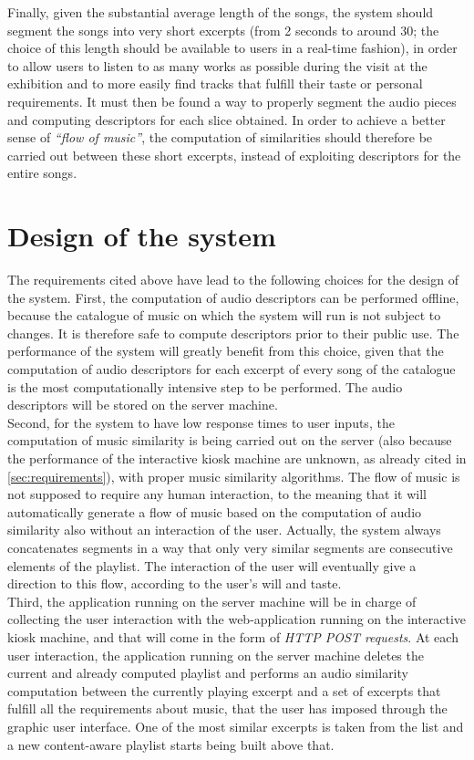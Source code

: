 Finally, given the substantial average length of the songs, the system should segment the songs into very short excerpts (from 2 seconds to around 30; the choice of this length should be available to users in a real-time fashion), in order to allow users to listen to as many works as possible during the visit at the exhibition and to more easily find tracks that fulfill their taste or personal requirements. It must then be found a way to properly segment the audio pieces and computing descriptors for each slice obtained. In order to achieve a better sense of \textit{``flow of music''}, the computation of similarities should therefore be carried out between these short excerpts, instead of exploiting descriptors for the entire songs.

\section{Design of the system}
The requirements cited above have lead to the following choices for the design of the system. First, the computation of audio descriptors can be performed offline, because the catalogue of music on which the system will run is not subject to changes. It is therefore safe to compute descriptors prior to their public use. The performance of the system will greatly benefit from this choice, given that the computation of audio descriptors for each excerpt of every song of the catalogue is the most computationally intensive step to be performed. The audio descriptors will be stored on the server machine.\\ Second, for the system to have low response times to user inputs, the computation of music similarity is being carried out on the server (also because the performance of the interactive kiosk machine are unknown, as already cited in \ref{sec:requirements}), with proper music similarity algorithms. The flow of music is not supposed to require any human interaction, to the meaning that it will automatically generate a flow of music based on the computation of audio similarity also without an interaction of the user. Actually, the system always concatenates segments in a way that only very similar segments are consecutive elements of the playlist. The interaction of the user will eventually give a direction to this flow, according to the user's will and taste. \\ Third, the application running on the server machine will be in charge of collecting the user interaction with the web-application running on the interactive kiosk machine, and that will come in the form of \textit{HTTP POST requests}. At each user interaction, the application running on the server machine deletes the current and already computed playlist and performs an audio similarity computation between the currently playing excerpt and a set of excerpts that fulfill all the requirements about music, that the user has imposed through the graphic user interface. One of the most similar excerpts is taken from the list and a new content-aware playlist starts being built above that. 

